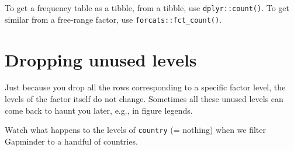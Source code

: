 \documentclass[
]{book}
\newenvironment{Shaded}{\begin{snugshade}}{\end{snugshade}}
\newcommand{\CommentTok}[1]{\textcolor[rgb]{0.56,0.35,0.01}{\textit{#1}}}
\newcommand{\KeywordTok}[1]{\textcolor[rgb]{0.13,0.29,0.53}{\textbf{#1}}}
\newcommand{\NormalTok}[1]{#1}
\newcommand{\OperatorTok}[1]{\textcolor[rgb]{0.81,0.36,0.00}{\textbf{#1}}}
\newcommand{\StringTok}[1]{\textcolor[rgb]{0.31,0.60,0.02}{#1}}
\begin{document}
To get a frequency table as a tibble, from a tibble, use \texttt{dplyr::count()}. To get similar from a free-range factor, use \texttt{forcats::fct\_count()}.

\begin{Shaded}
\end{Shaded}

\hypertarget{dropping-unused-levels}{%
\section{Dropping unused levels}\label{dropping-unused-levels}}

Just because you drop all the rows corresponding to a specific factor level, the levels of the factor itself do not change. Sometimes all these unused levels can come back to haunt you later, e.g., in figure legends.

Watch what happens to the levels of \texttt{country} (= nothing) when we filter Gapminder to a handful of countries.

\begin{Shaded}
\end{Shaded}
\end{document}

